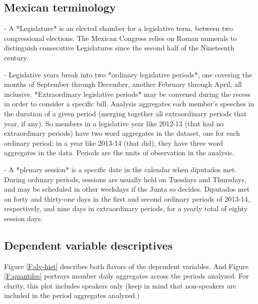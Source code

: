 \documentclass[letter,12pt]{article}
\begin{document}
\subsection{Mexican terminology}

- A *Legislature* is an elected chamber for a legislative term, between two congressional elections. The Mexican Congress relies on Roman numerals to distinguish consecutive Legislatures since the second half of the Nineteenth century.

- Legislative years break into two *ordinary legislative periods*, one covering the months of September through December, another February through April, all inclusive. *Extraordinary legislative periods* may be convened during the recess in order to consider a specific bill. Analysis aggregates each member's speeches in the duration of a given period (merging together all extraordinary periods that year, if any). So members in a legislative year like 2012-13 (that had no extraordinary periods) have two word aggregates in the dataset, one for each ordinary period; in a year like 2013-14 (that did), they have three word aggregates in the data. Periods are the units of observation in the analysis. 

- A *plenary session* is a specific date in the calendar when diputados met. During ordinary periods, sessions are usually held on Tuesdays and Thursdays, and may be scheduled in other weekdays if the Junta so decides. Diputados met on forty and thirty-one days in the first and second ordinary periods of 2013-14, respectively, and nine days in extraordinary periods, for a yearly total of eighty session days.

\subsection{Dependent variable descriptives}

Figure \ref{F:dv-hist} describes both flavors of the dependent variables. And Figure \ref{F:quantiles} portrays member daily aggregates across the periods analyzed. For clarity, this plot includes speakers only (keep in mind that non-speakers are included in the period aggregates analyzed.)
\end{document}

